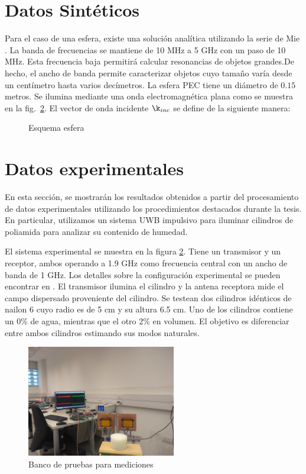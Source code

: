 \section{Datos Sintéticos}


Para el caso de una esfera, existe una solución analítica utilizando la serie de Mie \cite{Harrington2001}. La banda de frecuencias se mantiene de 10 MHz a 5 GHz con un paso de 10 MHz. Esta frecuencia baja permitirá calcular resonancias de objetos grandes.De hecho, el ancho de banda permite caracterizar objetos cuyo tamaño varía desde un centímetro hasta varios decímetros. La esfera PEC tiene un diámetro de $0.15$ metros. Se ilumina mediante una onda electromagnética plana como se muestra en la fig.~\ref{}. El vector de onda incidente $\k_{inc}$ se define de la siguiente manera: 

\begin{figure}[t]
	\centering
	
	\caption{Esquema esfera}
	\label{Fig:Sphere}	
\end{figure}

\section{Datos experimentales}

	En esta sección, se mostrarán los resultados obtenidos a partir del procesamiento de datos experimentales utilizando los  procedimientos destacados durante la tesis. En particular, utilizamos un sistema UWB impulsivo para iluminar cilindros de poliamida para analizar su contenido de humedad.
	
	El sistema experimental se muestra en la figura \ref{Fig:testbed}. Tiene un transmisor y un receptor, ambos operando a 1.9 GHz como frecuencia central con un ancho de banda de 1 GHz. Los detalles sobre la configuración experimental se pueden encontrar en \cite{Altieri2020}. El transmisor ilumina el cilindro y la antena receptora mide el campo dispersado proveniente del cilindro. Se testean dos cilindros idénticos de nailon 6 cuyo radio es de 5 cm y su altura 6.5 cm. Uno de los cilindros contiene un 0\%  de agua, mientras que el otro 2\% en volumen. El objetivo es diferenciar entre ambos cilindros estimando sus modos naturales.
	
	\begin{figure}[ht]
		\centerline{\includegraphics[width=6.5cm]{Figuras/testbed.jpg}}
		\caption{Banco de pruebas para mediciones}
		\label{Fig:testbed}
	\end{figure}
	
